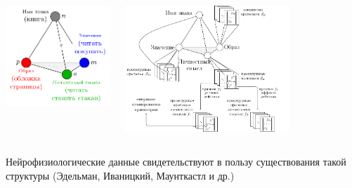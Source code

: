 \documentclass[default]{beamer}
\begin{document}
\begin{frame}
		\begin{columns}
			\begin{column}{0.4\textwidth}
				\centering
				\includegraphics[width=\textwidth]{signs/sign_color_book_ru}
			\end{column}
			\begin{column}{0.6\textwidth}
				\centering
				\includegraphics[width=0.7\textwidth]{signs/sign_details_ru}
			\end{column}
		\end{columns}
		\par\bigskip
		Нейрофизиологические данные свидетельствуют в пользу существования такой структуры (Эдельман, Иваницкий, Маунткастл и др.)
		\nocite{*}
		\printbibliography[keyword={nerosign}, resetnumbers=true]
		
	\end{frame}
\end{document}
